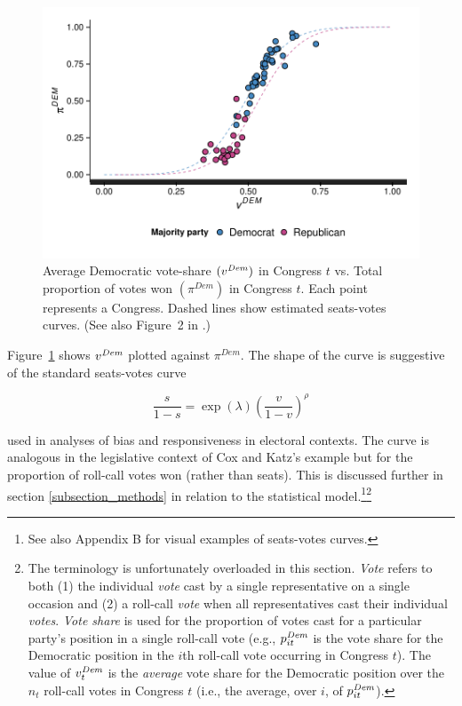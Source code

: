 \begin{figure}
\centering
	\includegraphics[scale=0.75]{sections/figs/vdem_vs_pdem}
\caption{Average Democratic vote-share $(v^{\it Dem})$ in Congress $t$ vs. Total proportion of 
votes won $(\pi^{Dem})$ in Congress $t$. Each point represents a Congress. Dashed lines show 
estimated seats-votes curves. (See also Figure~2 in \protect{}.)}
\label{fig:log_vratio_vs_ptdem}
\end{figure}


Figure~\ref{fig:log_vratio_vs_ptdem} shows $v^{\it Dem}$ plotted against $\pi^{Dem}$. 
The shape of the curve is suggestive of the standard seats-votes curve  

\begin{equation*}
 \frac{s}{1-s} = \exp{(\lambda)}\left(\frac{v}{1-v}\right)^\rho 
\end{equation*}

\noindent used in analyses of bias and responsiveness in electoral contexts. The curve is 
analogous in the legislative context of Cox and Katz's example but for the proportion of 
roll-call votes won (rather than seats). This is discussed further in section \ref{subsection_methods}
in relation to the statistical model.\footnote{See also Appendix B %
for visual examples of seats-votes curves.}\footnote{The terminology is unfortunately overloaded in this 
section. {\it Vote} refers to both (1) the individual {\it vote} cast by a single representative on a 
single occasion and (2) a roll-call {\it vote} when all representatives cast their individual {\it votes}. 
{\it Vote share} is used for the proportion of votes cast for a particular party's position in a single 
roll-call vote (e.g., $p^{\it Dem}_{it}$ is the vote share for the Democratic position in the $i$th 
roll-call vote occurring in Congress $t$). The value of $v_t^{\it Dem}$ is the {\it average} vote 
share for the Democratic position over the $n_t$ roll-call votes in Congress $t$ (i.e., the average, 
over $i$, of $p^{\it Dem}_{it}$). }  


